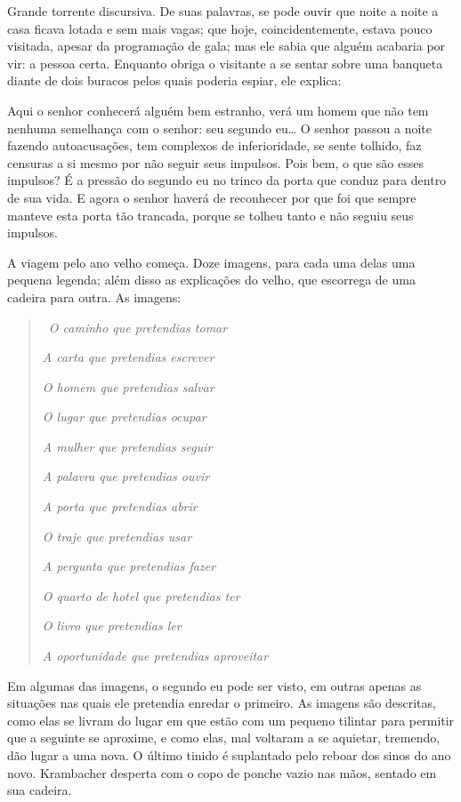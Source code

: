 Grande torrente discursiva. De suas palavras, se pode ouvir que noite a
noite a casa ficava lotada e sem mais vagas; que hoje, coincidentemente,
estava pouco visitada, apesar da programação de gala; mas ele sabia que
alguém acabaria por vir: a pessoa certa. Enquanto obriga o visitante a
se sentar sobre uma banqueta diante de dois buracos pelos quais poderia
espiar, ele explica:

Aqui o senhor conhecerá alguém bem estranho, verá um homem que não tem
nenhuma semelhança com o senhor: seu segundo eu\ldots{} O senhor passou a
noite fazendo autoacusações, tem complexos de inferioridade, se sente
tolhido, faz censuras a si mesmo por não seguir seus impulsos. Pois bem,
o que são esses impulsos? É a pressão do segundo eu no trinco da porta
que conduz para dentro de sua vida. E agora o senhor haverá de
reconhecer por que foi que sempre manteve esta porta tão trancada,
porque %
se tolheu tanto e não seguiu seus impulsos.

A viagem pelo ano velho começa. Doze imagens, para cada uma delas uma
pequena legenda; além disso as explicações do velho, que escorrega de
uma cadeira para outra. As imagens:

\begin{quote}
\quad\,
\emph{O caminho que pretendias tomar }

\emph{A carta que pretendias escrever }

\emph{O homem que pretendias salvar }

\emph{O lugar que pretendias ocupar }

\emph{A mulher que pretendias seguir }

\emph{A palavra que pretendias ouvir }

\emph{A porta que pretendias abrir }

\emph{O traje que pretendias usar }

\emph{A pergunta que pretendias fazer }

\emph{O quarto de hotel que pretendias ter }

\emph{O livro que pretendias ler }

\emph{A oportunidade que pretendias aproveitar }
\end{quote}

Em algumas das imagens, o segundo eu pode ser visto, em outras apenas as
situações nas quais ele pretendia enredar o primeiro. As imagens são
descritas, como elas se livram do lugar em que estão com um pequeno
tilintar para permitir que a seguinte se aproxime, e como elas, mal
voltaram a se aquietar, tremendo, dão lugar a uma nova. O último tinido
é suplantado pelo reboar dos sinos do ano novo. Krambacher desperta com
o copo de ponche vazio nas mãos, sentado em sua cadeira.

